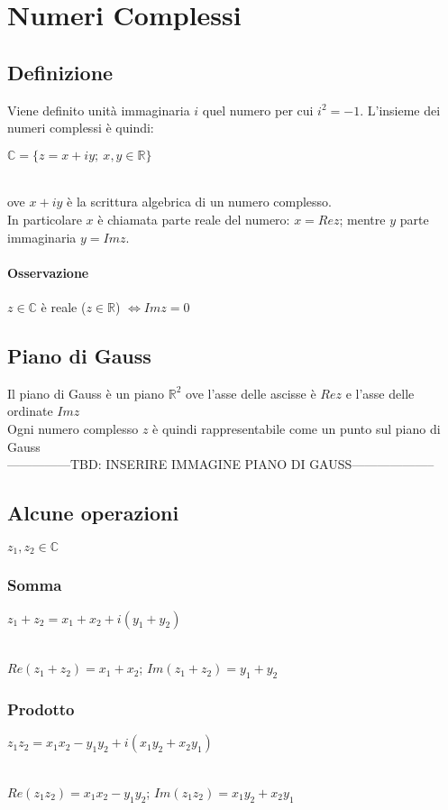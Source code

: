 \chapter{Numeri Complessi}
\section{Definizione}
Viene definito unità immaginaria $i$ quel numero per cui $i^2 = -1$.
L'insieme dei numeri complessi è quindi:\\
\begin{Large}
$\mathbb{C} = \{z = x + iy;\ x,y \in \mathbb{R}\}$
\end{Large}\\
ove $x + iy$ è la scrittura algebrica di un numero complesso.\\
In particolare $x$ è chiamata parte reale del numero: $x = Rez$; mentre $y$ parte immaginaria $y = Imz$.\\
\subsubsection{Osservazione}
$z \in \mathbb{C}$ è reale ($z \in \mathbb{R}$) $\iff Imz = 0$

\section{Piano di Gauss}
Il piano di Gauss è un piano $\mathbb{R}^2$ ove l'asse delle ascisse è $Rez$ e l'asse delle ordinate $Imz$\\
Ogni numero complesso $z$ è quindi rappresentabile come un punto sul piano di Gauss\\
---------------TBD: INSERIRE IMMAGINE PIANO DI GAUSS--------------------

\section{Alcune operazioni}
$z_1,z_2 \in \mathbb{C}$
\subsection{Somma}
\begin{Large}
$z_1+z_2 = x_1+x_2+i(y_1+y_2)$ 
\end{Large}\\
$Re(z_1+z_2) = x_1+x_2$;   $Im(z_1+z_2) = y_1+y_2$
\subsection{Prodotto}
\begin{Large}
$z_1z_2 = x_1x_2-y_1y_2+i(x_1y_2+ x_2y_1)$ 
\end{Large}\\
$Re(z_1z_2) = x_1x_2-y_1y_2$;   $Im(z_1z_2) = x_1y_2 + x_2y_1$
